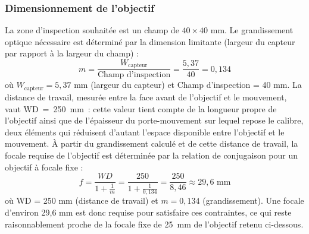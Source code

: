 \subsubsection{Dimensionnement de l'objectif}
La zone d'inspection souhaitée est un champ de $40 \times 40$ mm. 
Le grandissement optique nécessaire est déterminé par la dimension limitante (largeur du capteur par rapport à la largeur du champ) :
\begin{equation}
    m = \frac{W_{\text{capteur}}}{\text{Champ d'inspection}} = \frac{5,37}{40} = 0,134
    \label{eq:grandissement}
\end{equation}
\noindent où $W_{\text{capteur}} = 5,37$ mm (largeur du capteur) et Champ d'inspection = 40 mm.
La distance de travail, mesurée entre la face avant de l'objectif et le mouvement, vaut WD~=~250~mm~: cette valeur tient compte de la longueur propre de l'objectif ainsi que de l'épaisseur du porte-mouvement sur lequel repose le calibre, deux éléments qui réduisent d'autant l'espace disponible entre l'objectif et le mouvement.
À partir du grandissement calculé et de cette distance de travail, la focale requise de l'objectif est déterminée par la relation de conjugaison pour un objectif à focale fixe :
\begin{equation}
    f = \frac{WD}{1 + \frac{1}{m}} = \frac{250}{1 + \frac{1}{0,134}} = \frac{250}{8,46} \approx 29,6 \text{ mm}
    \label{eq:focale}
\end{equation}
\noindent où WD = 250 mm (distance de travail) et $m = 0,134$ (grandissement).
Une focale d'environ 29,6 mm est donc requise pour satisfaire ces contraintes, ce qui reste raisonnablement proche de la focale fixe de 25~mm de l'objectif retenu ci-dessous.

